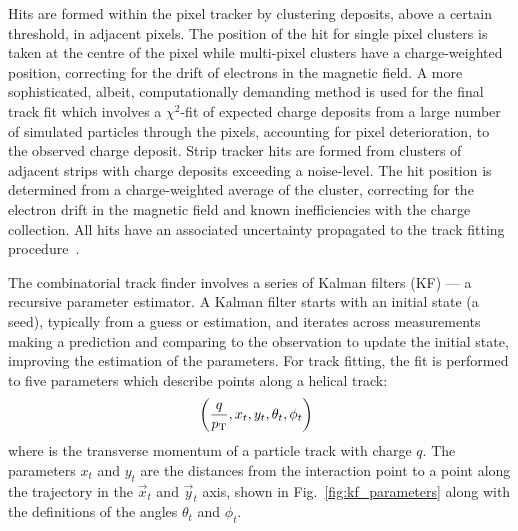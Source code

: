 Hits are formed within the pixel tracker by clustering deposits, above a
certain threshold, in adjacent pixels. The position of the hit for single
pixel clusters is taken at the centre of the pixel while multi-pixel clusters
have a charge-weighted position, correcting for the drift of electrons in the
magnetic field. A more sophisticated, albeit, computationally demanding method
is used for the final track fit which involves a $\chi^2$-fit of expected
charge deposits from a large number of simulated particles through the pixels,
accounting for pixel deterioration, to the observed charge deposit. Strip
tracker hits are formed from clusters of adjacent strips with charge deposits
exceeding a noise-level. The hit position is determined from a charge-weighted
average of the cluster, correcting for the electron drift in the magnetic
field and known inefficiencies with the charge collection. All hits have an
associated uncertainty propagated to the track fitting
procedure~\cite{Chatrchyan:1704291}.

The combinatorial track finder involves a series of Kalman filters (KF)
\cite{Kalman:1960} --- a recursive parameter estimator. A Kalman filter starts
with an initial state (a seed), typically from a guess or estimation,
and iterates across measurements making a prediction and comparing to the
observation to update the initial state, improving the estimation of the
parameters. For track fitting, the fit is performed to five parameters which
describe points along a helical track:
%
\begin{equation}
    \left( \frac{q}{p_{\text{T}}}, x_t, y_t, \theta_t, \phi_t \right)\ \,
\end{equation}
%
where \pt is the transverse momentum of a particle track with charge $q$. The
parameters $x_t$ and $y_t$ are the distances from the interaction point to a
point along the trajectory in the $\vec{x}_t$ and $\vec{y}_t$ axis, shown in
Fig.~\ref{fig:kf_parameters} along with the definitions of the angles
$\theta_t$ and $\phi_t$.

